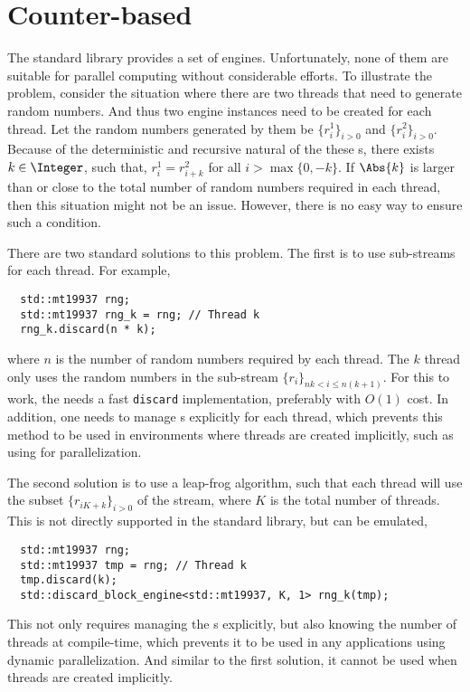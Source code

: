 \section{Counter-based \texorpdfstring{\protect\rng}{RNG}}
\label{sec:Counter-based RNG}

The standard library provides a set of \rng engines. Unfortunately, none of
them are suitable for parallel computing without considerable efforts. To
illustrate the problem, consider the situation where there are two threads that
need to generate random numbers. And thus two \rng engine instances need to be
created for each thread. Let the random numbers generated by them be
$\{r_i^1\}_{i>0}$ and $\{r_i^2\}_{i>0}$. Because of the deterministic and
recursive natural of the these \rng{}s, there exists $k\in\Integer$, such that,
$r_i^1 = r_{i + k}^2$ for all $i > \max\{0, -k\}$. If $\Abs{k}$ is larger than
or close to the total number of random numbers required in each thread, then
this situation might not be an issue. However, there is no easy way to ensure
such a condition.

There are two standard solutions to this problem. The first is to use
sub-streams for each thread. For example,
\begin{Verbatim}
  std::mt19937 rng;
  std::mt19937 rng_k = rng; // Thread k
  rng_k.discard(n * k);
\end{Verbatim}
where $n$ is the number of random numbers required by each thread. The $k$\ith
thread only uses the random numbers in the sub-stream $\{r_i\}_{nk < i \le
  n(k+1)}$. For this to work, the \rng needs a fast \verb|discard|
implementation, preferably with $O(1)$ cost. In addition, one needs to manage
\rng{}s explicitly for each thread, which prevents this method to be used in
environments where threads are created implicitly, such as using \tbb for
parallelization.

The second solution is to use a leap-frog algorithm, such that each thread will
use the subset $\{r_{iK + k}\}_{i>0}$ of the stream, where $K$ is the total
number of threads. This is not directly supported in the standard library, but
can be emulated,
\begin{Verbatim}
  std::mt19937 rng;
  std::mt19937 tmp = rng; // Thread k
  tmp.discard(k);
  std::discard_block_engine<std::mt19937, K, 1> rng_k(tmp);
\end{Verbatim}
This not only requires managing the \rng{}s explicitly, but also knowing the
number of threads at compile-time, which prevents it to be used in any
applications using dynamic parallelization. And similar to the first solution,
it cannot be used when threads are created implicitly.

